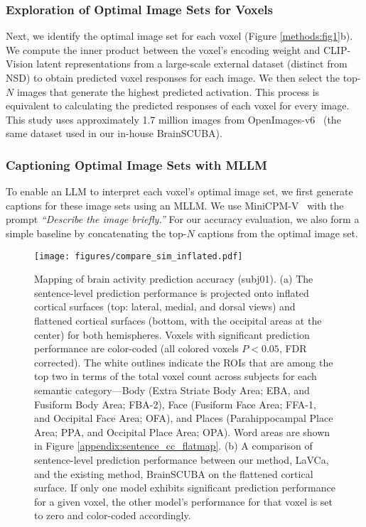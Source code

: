 \subsubsection{Exploration of Optimal Image Sets for Voxels}
Next, we identify the optimal image set for each voxel (Figure \ref{methods:fig1}b). We compute the inner product between the voxel’s encoding weight and CLIP-Vision latent representations from a large-scale external dataset (distinct from NSD) to obtain predicted voxel responses for each image. We then select the top-$N$ images that generate the highest predicted activation. This process is equivalent to calculating the predicted responses of each voxel for every image. This study uses approximately 1.7 million images from OpenImages-v6~\cite{OpenImages} (the same dataset used in our in-house BrainSCUBA).

\subsubsection{Captioning Optimal Image Sets with MLLM}
To enable an LLM to interpret each voxel’s optimal image set, we first generate captions for these image sets using an MLLM. We use MiniCPM-V~\cite{yao2024minicpmv} with the prompt \textit{``Describe the image briefly.''} For our accuracy evaluation, we also form a simple baseline by concatenating the top-$N$ captions from the optimal image set. 

\begin{figure*}[t]
  \centering
  \texttt{[image: figures/compare\_sim\_inflated.pdf]}
  \vskip 0.1in
  \caption{Mapping of brain activity prediction accuracy (subj01). (a) The sentence-level prediction performance is projected onto inflated cortical surfaces
  (top: lateral, medial, and dorsal views) and flattened cortical surfaces (bottom, with the occipital areas at the center) for both hemispheres. Voxels with significant prediction performance are color-coded (all colored voxels $P<0.05$, FDR corrected). The white outlines indicate the ROIs that are among the top two in terms of the total voxel count across subjects for each semantic category—Body (Extra Striate Body Area; EBA, and Fusiform Body Area; FBA-2), Face (Fusiform Face Area; FFA-1, and Occipital Face Area; OFA), and Places (Parahippocampal Place Area; PPA, and Occipital Place Area; OPA). Word areas are shown in Figure \ref{appendix:sentence_cc_flatmap}. (b) A comparison of sentence-level prediction performance between our method, LaVCa, and the existing method, BrainSCUBA on the flattened cortical surface. If only one model exhibits significant prediction performance for a given voxel, the other model's performance for that voxel is set to zero and color-coded accordingly.}
  \label{results:accuracy_mapping}
\end{figure*}

